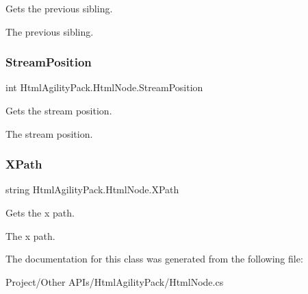 Gets the previous sibling. 

The previous sibling.\mbox{\label{class_html_agility_pack_1_1_html_node_aa6ae06ace7dbc9d61f94c6a501810ac0}} 
\subsubsection{\texorpdfstring{Stream\+Position}{StreamPosition}}
{\footnotesize\ttfamily int Html\+Agility\+Pack.\+Html\+Node.\+Stream\+Position\hspace{0.3cm}{\ttfamily [get]}}



Gets the stream position. 

The stream position.\mbox{\label{class_html_agility_pack_1_1_html_node_a689dc36bee07f9c1f265e45daa19c13c}} 
\subsubsection{\texorpdfstring{X\+Path}{XPath}}
{\footnotesize\ttfamily string Html\+Agility\+Pack.\+Html\+Node.\+X\+Path\hspace{0.3cm}{\ttfamily [get]}}



Gets the x path. 

The x path.

The documentation for this class was generated from the following file\+:\begin{DoxyCompactItemize}
\item 
Project/\+Other A\+P\+Is/\+Html\+Agility\+Pack/Html\+Node.\+cs\end{DoxyCompactItemize}
